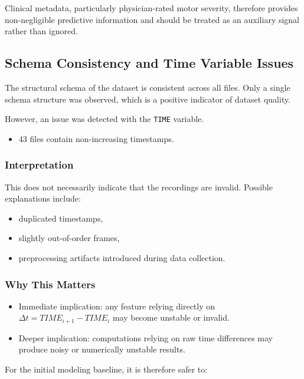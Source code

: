 \documentclass[11pt,twocolumn]{article}
\begin{document}
Clinical metadata, particularly physician-rated motor severity, therefore provides non-negligible predictive information and should be treated as an auxiliary signal rather than ignored.

\subsection{Schema Consistency and Time Variable Issues}

The structural schema of the dataset is consistent across all files. Only a single schema structure was observed, which is a positive indicator of dataset quality.

However, an issue was detected with the \texttt{TIME} variable.

\begin{itemize}
    \item 43 files contain non-increasing timestamps.
\end{itemize}

\subsubsection{Interpretation}

This does not necessarily indicate that the recordings are invalid. Possible explanations include:

\begin{itemize}
    \item duplicated timestamps,
    \item slightly out-of-order frames,
    \item preprocessing artifacts introduced during data collection.
\end{itemize}

\subsubsection{Why This Matters}

\begin{itemize}
    \item Immediate implication: any feature relying directly on 
    $\Delta t = TIME_{i+1} - TIME_i$ may become unstable or invalid.
    
    \item Deeper implication: computations relying on raw time differences may produce noisy or numerically unstable results.
\end{itemize}

For the initial modeling baseline, it is therefore safer to:
\end{document}
